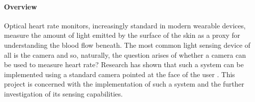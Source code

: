 \paragraph{Overview}
Optical heart rate monitors, increasingly standard in modern wearable devices, measure the amount of light emitted by the surface of the 
skin as a proxy for understanding the blood flow beneath.
The most common light sensing device of all is the camera and so, naturally, the question arises of whether a camera can be used to measure heart rate?
Research has shown that such a system can be implemented using a standard camera pointed at the face of the user \cite{poh2010non}\cite{vanderKooij2019}\cite{Verkruysse2008}. This project is concerned with the implementation of such a system and the further investigation of its sensing capabilities.

